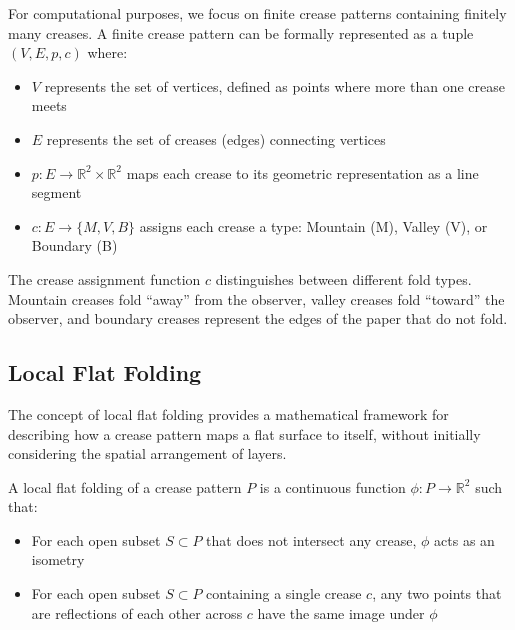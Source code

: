 For computational purposes, we focus on finite crease patterns containing finitely many creases. A finite crease pattern can be formally represented as a tuple $(V, E, p, c)$ where:

\begin{itemize}
\item $V$ represents the set of vertices, defined as points where more than one crease meets
\item $E$ represents the set of creases (edges) connecting vertices
\item $p: E \to \mathbb{R}^2 \times \mathbb{R}^2$ maps each crease to its geometric representation as a line segment
\item $c: E \to \{M, V, B\}$ assigns each crease a type: Mountain (M), Valley (V), or Boundary (B)
\end{itemize}

The crease assignment function $c$ distinguishes between different fold types. Mountain creases fold ``away'' from the observer, valley creases fold ``toward'' the observer, and boundary creases represent the edges of the paper that do not fold.

\subsection{Local Flat Folding}

The concept of local flat folding provides a mathematical framework for describing how a crease pattern maps a flat surface to itself, without initially considering the spatial arrangement of layers.

\begin{definition}
A local flat folding of a crease pattern $P$ is a continuous function $\phi: P \to \mathbb{R}^2$ such that:
\begin{itemize}
\item For each open subset $S \subset P$ that does not intersect any crease, $\phi$ acts as an isometry
\item For each open subset $S \subset P$ containing a single crease $c$, any two points that are reflections of each other across $c$ have the same image under $\phi$
\end{itemize}
\end{definition}

